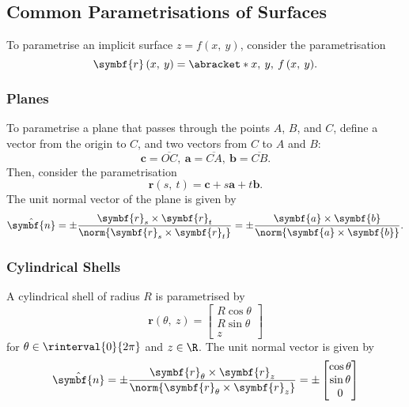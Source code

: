 \documentclass{article}
\begin{document}
\subsection{Common Parametrisations of Surfaces}
To parametrise an implicit surface \(z = f\left( x,\: y \right)\),
consider the parametrisation
\begin{equation*}
    \symbf{r}\left( x,\: y \right) = \abracket*{x,\: y,\: f\left( x,\: y \right)}.
\end{equation*}
\subsubsection{Planes}
To parametrise a plane that passes through the points \(A\), \(B\), and
\(C\), define a vector from the origin to \(C\), and two vectors from
\(C\) to \(A\) and \(B\):
\begin{equation*}
    \symbf{c} = \overline{OC},\: \symbf{a} = \overline{CA},\: \symbf{b} = \overline{CB}.
\end{equation*}
Then, consider the parametrisation
\begin{equation*}
    \symbf{r}\left( s,\: t \right) = \symbf{c} + s \symbf{a} + t \symbf{b}.
\end{equation*}
The unit normal vector of the plane is given by
\begin{equation*}
    \hat{\symbf{n}} = \pm \frac{\symbf{r}_s \times \symbf{r}_t}{\norm{\symbf{r}_s \times \symbf{r}_t}} =
    \pm \frac{\symbf{a} \times \symbf{b}}{\norm{\symbf{a} \times \symbf{b}}}.
\end{equation*}
\subsubsection{Cylindrical Shells}
A cylindrical shell of radius \(R\) is parametrised by
\begin{equation*}
    \symbf{r}\left( \theta,\: z \right) =
    \begin{bmatrix}
        R \cos{\theta} \\
        R \sin{\theta} \\
        z
    \end{bmatrix}
\end{equation*}
for \(\theta \in \rinterval{0}{2 \pi}\) and \(z \in \R\).
The unit normal vector is given by
\begin{equation*}
    \hat{\symbf{n}} = \pm \frac{\symbf{r}_\theta \times \symbf{r}_z}{\norm{\symbf{r}_\theta \times \symbf{r}_z}} =
    \pm
    \begin{bmatrix}
        \cos{\theta} \\
        \sin{\theta} \\
        0
    \end{bmatrix}
\end{equation*}
\end{document}
